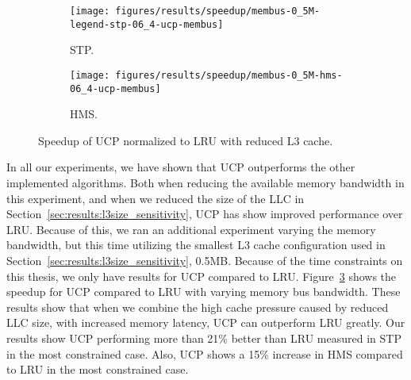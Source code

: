 \begin{figure}[t]
    \centering
        \begin{subfigure}[b]{0.5\textwidth}
            \texttt{[image: figures/results/speedup/membus-0\_5M-legend-stp-06\_4-ucp-membus]}
            \caption{STP.}
            \label{fig:results:bus-05:ucp:stp}
        \end{subfigure}%
        \begin{subfigure}[b]{0.5\textwidth}
            \texttt{[image: figures/results/speedup/membus-0\_5M-hms-06\_4-ucp-membus]}
            \caption{HMS.}
            \label{fig:results:bus-05:ucp:hms}
        \end{subfigure}
        \caption{Speedup of UCP normalized to LRU with reduced L3 cache.}
        \label{fig:results:bus-05:ucp}
\end{figure}


In all our experiments, we have shown that UCP outperforms the other implemented algorithms.
Both when reducing the available memory bandwidth in this experiment, and when we reduced the size of the LLC in Section~\ref{sec:results:l3size_sensitivity}, UCP has show improved performance over LRU.
Because of this, we ran an additional experiment varying the memory bandwidth, but this time utilizing the smallest L3 cache configuration used in Section~\ref{sec:results:l3size_sensitivity}, 0.5MB.
Because of the time constraints on this thesis, we only have results for UCP compared to LRU.
Figure~\ref{fig:results:bus-05:ucp} shows the speedup for UCP compared to LRU with varying memory bus bandwidth.
These results show that when we combine the high cache pressure caused by reduced LLC size, with increased memory latency, UCP can outperform LRU greatly.
Our results show UCP performing more than 21\% better than LRU measured in STP in the most constrained case.
Also, UCP shows a 15\% increase in HMS compared to LRU in the most constrained case.
